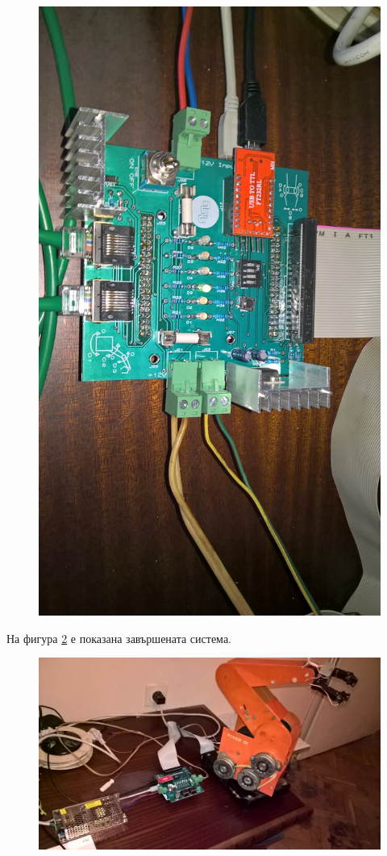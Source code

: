 \begin{figure}[!htb]
    \centering
    \includegraphics[width=0.8\linewidth]{pictures/all_plugged_in.jpg}
    \label{fig:pcb_sandwich}
\end{figure}
\indent{}
На фигура \ref{fig:compl_sys} е показана завършената система.
\begin{figure}[!htb]
    \centering
    \includegraphics[width=0.8\linewidth]{pictures/completed_system.jpg}
    \label{fig:compl_sys}
\end{figure}
